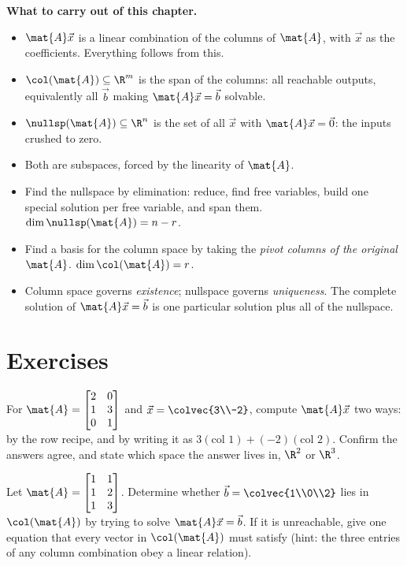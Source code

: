 \begin{focusbox}
\textbf{What to carry out of this chapter.}
\begin{itemize}
  \item $\mat{A}\vec{x}$ is a linear combination of the columns of $\mat{A}$, with
  $\vec{x}$ as the coefficients. Everything follows from this.
  \item $\col(\mat{A})\subseteq\R^m$ is the span of the columns: all reachable
  outputs, equivalently all $\vec{b}$ making $\mat{A}\vec{x}=\vec{b}$ solvable.
  \item $\nullsp(\mat{A})\subseteq\R^n$ is the set of all $\vec{x}$ with
  $\mat{A}\vec{x}=\vec{0}$: the inputs crushed to zero.
  \item Both are subspaces, forced by the linearity of $\mat{A}$.
  \item Find the nullspace by elimination: reduce, find free variables, build one
  special solution per free variable, and span them. $\dim\nullsp(\mat{A})
  = n - r$.
  \item Find a basis for the column space by taking the \emph{pivot columns of the
  original $\mat{A}$}. $\dim\col(\mat{A}) = r$.
  \item Column space governs \emph{existence}; nullspace governs \emph{uniqueness}.
  The complete solution of $\mat{A}\vec{x}=\vec{b}$ is one particular solution
  plus all of the nullspace.
\end{itemize}
\end{focusbox}

\section{Exercises}

\begin{exercise}\label{ch12:ex-combo}
For $\mat{A}=\begin{bmatrix}2 & 0\\1 & 3\\0 & 1\end{bmatrix}$ and
$\vec{x}=\colvec{3\\-2}$, compute $\mat{A}\vec{x}$ two ways: by the row recipe,
and by writing it as $3(\text{col }1) + (-2)(\text{col }2)$. Confirm the answers
agree, and state which space the answer lives in, $\R^2$ or $\R^3$.
\end{exercise}

\begin{exercise}\label{ch12:ex-reachable}
Let $\mat{A}=\begin{bmatrix}1 & 1\\1 & 2\\1 & 3\end{bmatrix}$. Determine whether
$\vec{b}=\colvec{1\\0\\2}$ lies in $\col(\mat{A})$ by trying to solve
$\mat{A}\vec{x}=\vec{b}$. If it is unreachable, give one equation that every
vector in $\col(\mat{A})$ must satisfy (hint: the three entries of any column
combination obey a linear relation).
\end{exercise}

